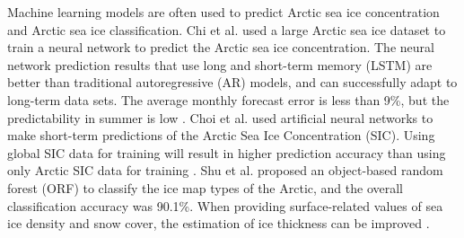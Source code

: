 Machine learning models are often used to predict Arctic sea ice concentration and Arctic sea ice classification. Chi et al. used a large Arctic sea ice dataset to train a neural network to predict the Arctic sea ice concentration. The neural network prediction results that use long and short-term memory (LSTM) are better than traditional autoregressive (AR) models, and can successfully adapt to long-term data sets. The average monthly forecast error is less than 9\%, but the predictability in summer is low \cite{chi2017prediction}. Choi et al. used artificial neural networks to make short-term predictions of the Arctic Sea Ice Concentration (SIC). Using global SIC data for training will result in higher prediction accuracy than using only Arctic SIC data for training \cite{choi2019artificial}. Shu et al. proposed an object-based random forest (ORF) to classify the ice map types of the Arctic, and the overall classification accuracy was 90.1\%. When providing surface-related values of sea ice density and snow cover, the estimation of ice thickness can be improved \cite{shu2020discrimination}.
